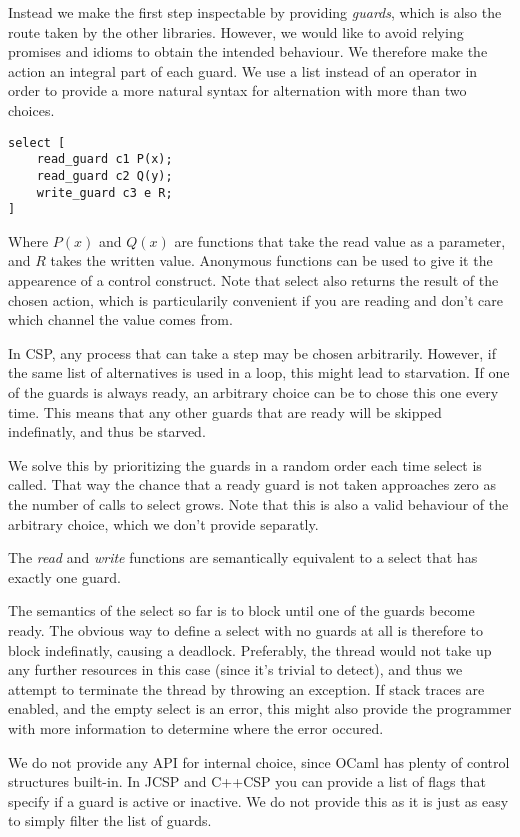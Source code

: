 \documentclass[a4paper,12pt]{article}
\begin{document}
Instead we make the first step inspectable by providing \emph{guards}, which is also the route taken by
the other libraries. However, we would like to avoid relying promises and idioms to obtain the 
intended behaviour. We therefore make the action an integral part of each guard. We use a list instead
of an operator in order to provide a more natural syntax for alternation with more than two choices.

\begin{verbatim}
select [
    read_guard c1 P(x);
    read_guard c2 Q(y);
    write_guard c3 e R;
]
\end{verbatim}
Where $P(x)$ and $Q(x)$ are functions that take the read value as a parameter, and $R$ takes the written 
value. Anonymous functions can be used to give it the appearence of a control construct. Note that select 
also returns the result of the chosen action, which is particularily convenient if you are reading and 
don't care which channel the value comes from.

In CSP, any process that can take a step may be chosen arbitrarily. However, if the same list of 
alternatives is used in a loop, this might lead to starvation. If one of the guards is always ready,
an arbitrary choice can be to chose this one every time. This means that any other guards that are 
ready will be skipped indefinatly, and thus be starved.

We solve this by prioritizing the guards in a random order each time select is called. That way the
chance that a ready guard is not taken approaches zero as the number of calls to select grows. Note 
that this is also a valid behaviour of the arbitrary choice, which we don't provide separatly.

The \emph{read} and \emph{write} functions are semantically equivalent to a select that has exactly 
one guard.

The semantics of the select so far is to block until one of the guards become ready. The obvious
way to define a select with no guards at all is therefore to block indefinatly, causing a deadlock.
Preferably, the thread would not take up any further resources in this case (since it's trivial to 
detect), and thus we attempt to terminate the thread by throwing an exception. If stack traces are
enabled, and the empty select is an error, this might also provide the programmer with more information
to determine where the error occured.

We do not provide any API for internal choice, since OCaml has plenty of control structures built-in.
In JCSP and C++CSP you can provide a list of flags that specify if a guard is active or inactive. We
do not provide this as it is just as easy to simply filter the list of guards.
\end{document}
